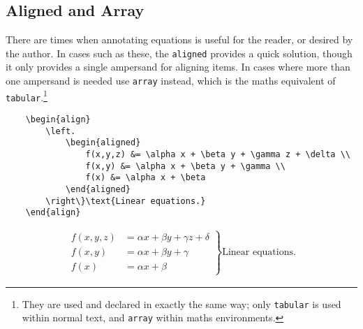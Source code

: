 \subsection{Aligned and Array}
%
There are times when annotating equations is useful for the reader, or
desired by the author.  In cases such as these, the \verb|aligned|
provides a quick solution, though it only provides a single ampersand
for aligning items.  In cases where more than one ampersand is needed
use \verb|array| instead, which is the maths equivalent of
\verb|tabular|.\footnote{They are used and declared in exactly the
  same way; only \texttt{tabular} is used within normal text, and
  \texttt{array} within maths environments.}
\begin{verbatim}
	\begin{align}
	    \left.
	        \begin{aligned}
	            f(x,y,z) &= \alpha x + \beta y + \gamma z + \delta \\
	            f(x,y) &= \alpha x + \beta y + \gamma \\
	            f(x) &= \alpha x + \beta
	        \end{aligned}
	    \right\}\text{Linear equations.}
	\end{align}
\end{verbatim}
\begin{align}
    \left.
    \begin{aligned}
        f(x,y,z) &= \alpha x + \beta y + \gamma z + \delta \\
        f(x,y) &= \alpha x + \beta y + \gamma\\
        f(x) &= \alpha x + \beta
    \end{aligned}
    \right\}\text{Linear equations.}
\end{align}
%
